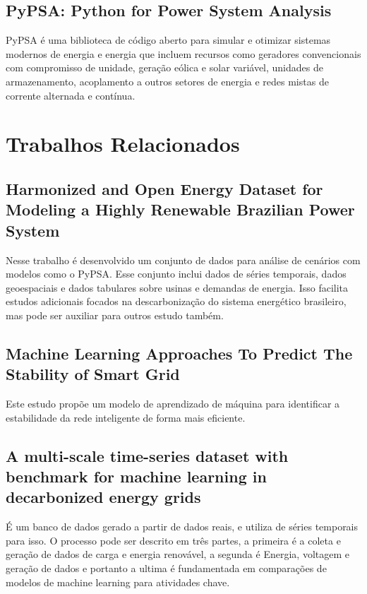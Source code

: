 \documentclass[a4paper,12pt]{article}
\begin{document}
\subsection{PyPSA: Python for Power System Analysis}
PyPSA é uma biblioteca de código aberto para simular e otimizar sistemas modernos de energia e energia que incluem recursos como geradores convencionais com compromisso de unidade, geração eólica e solar variável, unidades de armazenamento, acoplamento a outros setores de energia e redes mistas de corrente alternada e contínua.


\section{Trabalhos Relacionados}
\subsection{Harmonized and Open Energy Dataset for Modeling a Highly Renewable Brazilian Power System}

Nesse trabalho é desenvolvido um conjunto de dados para análise de cenários com modelos como o PyPSA.
Esse conjunto inclui dados de séries temporais, dados geoespaciais e dados tabulares sobre usinas e demandas de energia.
Isso facilita estudos adicionais focados na descarbonização do sistema energético brasileiro, mas pode ser auxiliar para outros estudo também.

\subsection{Machine Learning Approaches To Predict The Stability of Smart Grid}

Este estudo propõe um modelo de aprendizado de máquina para identificar a estabilidade da rede inteligente de forma mais eficiente.

\subsection{A multi-scale time-series dataset with benchmark for machine learning in decarbonized energy grids}

É um banco de dados gerado a partir de dados reais, e utiliza de séries temporais para isso. O processo pode ser descrito em três partes, a primeira é a coleta e geração de dados de carga e energia renovável, a segunda é Energia, voltagem e geração de dados e portanto a ultima é fundamentada em comparações de modelos de machine learning para atividades chave.
\end{document}
